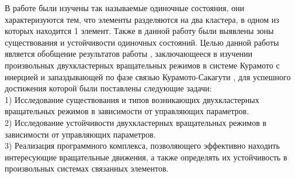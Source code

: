 В работе \cite{slava} были изучены так называемые одиночные состояния, они характеризуются тем, что элементы разделяются на два кластера,
в одном из которых находится 1 элемент. Также в данной работу были выявлены зоны существования и устойчивости одиночных состояний.
Целью данной работы является обобщение результатов работы \cite{slava}, заключающееся в изучении
произвольных двухкластерных вращательных режимов в системе Курамото
с инерцией и запаздывающей по фазе связью Курамото-Сакагути \cite{Sakaguchi}, для успешного достижения которой были поставлены следующие задачи: \\
1) Исследование существования и типов возникающих двухкластерных вращательных режимов в зависимости от управляющих параметров. \\
2) Исследование устойчивости двухкластерных вращательных режимов в зависимости от управляющих параметров. \\
3) Реализация программного комплекса, позволяющего эффективно находить интересующие вращательные движения, а также определять
их устойчивость в произвольных системах связанных элементов.

